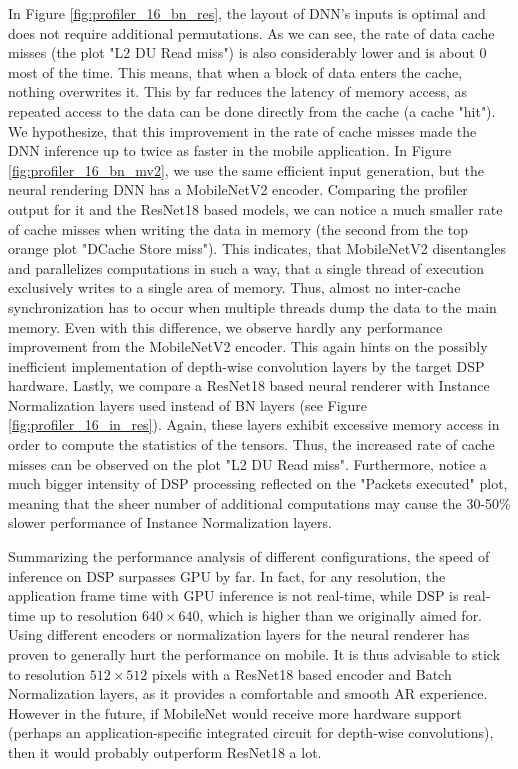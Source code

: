 In Figure \ref{fig:profiler_16_bn_res}, the layout of DNN's inputs is optimal and does not require additional permutations. As we can see, the rate of data cache misses (the plot "L2 DU Read miss") is also considerably lower and is about 0 most of the time. This means, that when a block of data enters the cache, nothing overwrites it. This by far reduces the latency of memory access, as repeated access to the data can be done directly from the cache (a cache "hit"). We hypothesize, that this improvement in the rate of cache misses made the DNN inference up to twice as faster in the mobile application. In Figure \ref{fig:profiler_16_bn_mv2}, we use the same efficient input generation, but the neural rendering DNN has a MobileNetV2 encoder. Comparing the profiler output for it and the ResNet18 based models, we can notice a much smaller rate of cache misses when writing the data in memory (the second from the top orange plot "DCache Store miss"). This indicates, that MobileNetV2 disentangles and parallelizes computations in such a way, that a single thread of execution exclusively writes to a single area of memory. Thus, almost no inter-cache synchronization has to occur when multiple threads dump the data to the main memory. Even with this difference, we observe hardly any performance improvement from the MobileNetV2 encoder. This again hints on the possibly inefficient implementation of depth-wise convolution layers by the target DSP hardware. Lastly, we compare a ResNet18 based neural renderer with Instance Normalization layers used instead of BN layers (see Figure \ref{fig:profiler_16_in_res}). Again, these layers exhibit excessive memory access in order to compute the statistics of the tensors. Thus, the increased rate of cache misses can be observed on the plot "L2 DU Read miss". Furthermore, notice a much bigger intensity of DSP processing reflected on the "Packets executed" plot, meaning that the sheer number of additional computations may cause the 30-50\% slower performance of Instance Normalization layers.

Summarizing the performance analysis of different configurations, the speed of inference on DSP surpasses GPU by far. In fact, for any resolution, the application frame time with GPU inference is not real-time, while DSP is real-time up to resolution $640 \times 640$, which is higher than we originally aimed for. Using different encoders or normalization layers for the neural renderer has proven to generally hurt the performance on mobile. It is thus advisable to stick to resolution $512 \times 512$ pixels with a ResNet18 based encoder and Batch Normalization layers, as it provides a comfortable and smooth AR experience. However in the future, if MobileNet would receive more hardware support (perhaps an application-specific integrated circuit for depth-wise convolutions), then it would probably outperform ResNet18 a lot.

